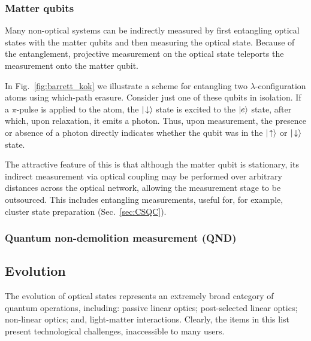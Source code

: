 %
%

\subsubsection{Matter qubits} 

Many non-optical systems can be indirectly measured by first entangling optical states with the matter qubits and then measuring the optical state. Because of the entanglement, projective measurement on the optical state teleports the measurement onto the matter qubit.

In Fig.~\ref{fig:barrett_kok} we illustrate a scheme for entangling two $\lambda$-configuration atoms using which-path erasure. Consider just one of these qubits in isolation. If a $\pi$-pulse is applied to the atom, the $|\!\downarrow\rangle$ state is excited to the $|e\rangle$ state, after which, upon relaxation, it emits a photon. Thus, upon measurement, the presence or absence of a photon directly indicates whether the qubit was in the $|\!\uparrow\rangle$ or $|\!\downarrow\rangle$ state.

The attractive feature of this is that although the matter qubit is stationary, its indirect measurement via optical coupling may be performed over arbitrary distances across the optical network, allowing the measurement stage to be outsourced. This includes entangling measurements, useful for, for example, cluster state preparation (Sec.~\ref{sec:CSQC}).

%
%

\subsubsection{Quantum non-demolition measurement (QND)}


%
%

\subsection{Evolution}

The evolution of optical states represents an extremely broad category of quantum operations, including: passive linear optics; post-selected linear optics; non-linear optics; and, light-matter interactions. Clearly, the items in this list present technological challenges, inaccessible to many users.

